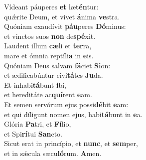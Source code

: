 \oddverse Vídeant páuperes \textbf{et} læ\textbf{tén}tur:~\*\\
\oddverse quǽrite Deum, et vivet \textbf{á}nima \textbf{ve}stra.\\
\evenverse Quóniam exaudívit \textbf{páu}peres \textbf{Dó}minus:~\*\\
\evenverse et vinctos suos \textbf{non} de\textbf{spé}xit.\\
\oddverse Laudent illum \textbf{cæ}li et \textbf{ter}ra,~\*\\
\oddverse mare et ómnia reptíli\textbf{a} in \textbf{e}is.\\
\evenverse Quóniam Deus salvam \textbf{fá}ciet \textbf{Si}on:~\*\\
\evenverse et ædificabúntur civi\textbf{tá}tes \textbf{Ju}da.\\
\oddverse Et inhabi\textbf{tá}bunt \textbf{i}bi,~\*\\
\oddverse et hereditáte ac\textbf{quí}rent \textbf{e}am.\\
\evenverse Et semen servórum ejus possi\textbf{dé}bit \textbf{e}am:~\*\\
\evenverse et qui díligunt nomen ejus, habi\textbf{tá}bunt in \textbf{e}a.\\
\oddverse Glória \textbf{Pa}tri, et \textbf{Fí}lio,~\*\\
\oddverse et Spi\textbf{rí}tui \textbf{San}cto.\\
\evenverse Sicut erat in princípio, et \textbf{nunc}, et \textbf{sem}per,~\*\\
\evenverse et in sǽcula sæcu\textbf{ló}rum. \textbf{A}men.\\
